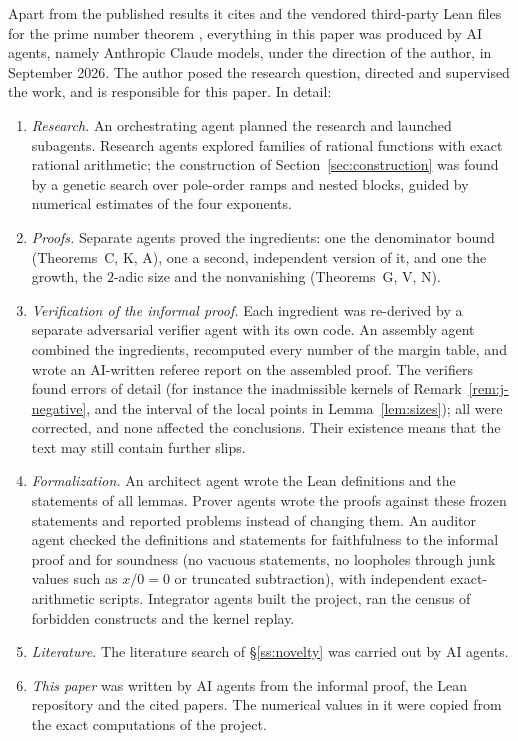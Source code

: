 \documentclass{amsart}
\theoremstyle{definition}
\theoremstyle{remark}
\numberwithin{equation}{section}
\begin{document}
Apart from the published results it cites and the vendored third-party Lean
files for the prime number theorem \cite{PNTLean}, everything in this paper
was produced by AI agents, namely Anthropic Claude models, under the direction
of the author, in September 2026. The author posed the research question,
directed and supervised the work, and is responsible for this paper. In
detail:
\begin{enumerate}
\item[(1)] \emph{Research.} An orchestrating agent planned the research and
  launched subagents. Research agents explored families of rational functions
  with exact rational arithmetic; the construction of
  Section~\ref{sec:construction} was found by a genetic search over pole-order
  ramps and nested blocks, guided by numerical estimates of the four exponents.
\item[(2)] \emph{Proofs.} Separate agents proved the ingredients: one the
  denominator bound (Theorems~C, K, A), one a second, independent version of
  it, and one the growth, the $2$-adic size and the nonvanishing
  (Theorems~G, V, N).
\item[(3)] \emph{Verification of the informal proof.} Each ingredient was
  re-derived by a separate adversarial verifier agent with its own code. An
  assembly agent combined the ingredients, recomputed every number of the
  margin table, and wrote an AI-written referee report on the assembled
  proof. The verifiers found errors of detail (for instance the inadmissible
  kernels of Remark~\ref{rem:j-negative}, and the interval of the local points
  in Lemma~\ref{lem:sizes}); all were corrected, and none affected the
  conclusions. Their existence means that the text may still contain further
  slips.
\item[(4)] \emph{Formalization.} An architect agent wrote the Lean definitions
  and the statements of all lemmas. Prover agents wrote the proofs against
  these frozen statements and reported problems instead of changing them. An
  auditor agent checked the definitions and statements for faithfulness to the
  informal proof and for soundness (no vacuous statements, no loopholes
  through junk values such as $x/0=0$ or truncated subtraction), with
  independent exact-arithmetic scripts. Integrator agents built the project,
  ran the census of forbidden constructs and the kernel replay.
\item[(5)] \emph{Literature.} The literature search of \S\ref{ss:novelty} was
  carried out by AI agents.
\item[(6)] \emph{This paper} was written by AI agents from the informal proof,
  the Lean repository and the cited papers. The numerical values in it were
  copied from the exact computations of the project.
\end{enumerate}
\end{document}
